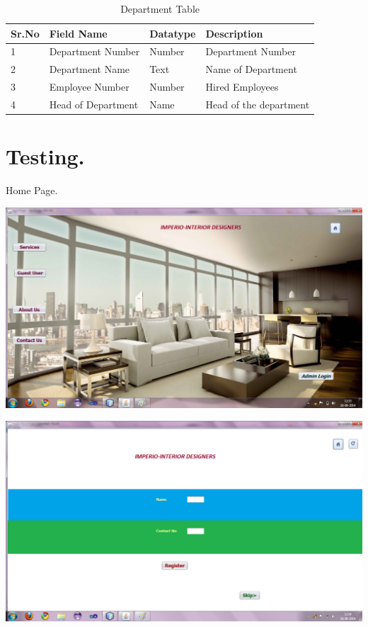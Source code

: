 \documentclass[12pt,a4paper]{report}
\begin{document}
\begin{table}[ht]
\begin{tabular}{| l | l | l | l |}
\hline
Sr.No & Field Name & Datatype & Description\\ \hline
1 & Department Number & Number & Department Number \\ \hline
2 & Department Name & Text & Name of Department \\ \hline
3 & Employee Number & Number & Hired Employees \\ \hline
4 & Head of Department & Name & Head of the department \\ \hline
\end{tabular}
\caption{Department Table}
\end{table}%

\chapter{Testing.}%
Home Page.
\begin{center}
\includegraphics[scale=0.45]{1.png}
\end{center}
\begin{center}
\includegraphics[scale=0.45]{2.png}
\end{center}
\end{document}
